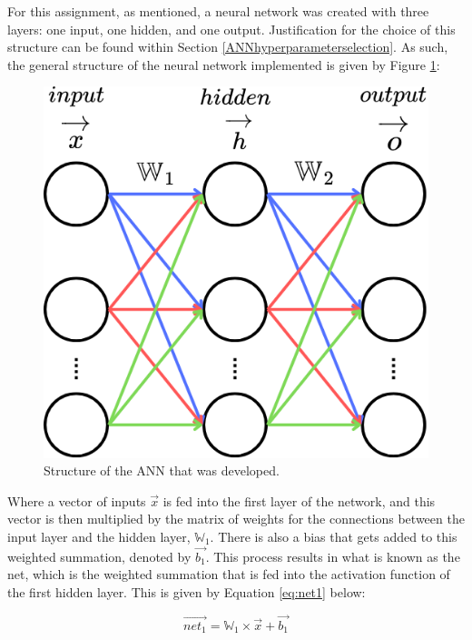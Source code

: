 \documentclass[a4paper]{article}
\begin{document}
For this assignment, as mentioned, a neural network was created with three layers: one input, one hidden, and one output. Justification for the choice of this structure can be found within Section \ref{ANNhyperparameterselection}. As such, the general structure of the neural network implemented is given by Figure \ref{fig:annstructure}:

\begin{figure}[h]
    \centering
    \includegraphics[scale = 0.5]{images/annstructure.png}
    \caption{Structure of the ANN that was developed.}
    \label{fig:annstructure}
\end{figure}

Where a vector of inputs $\overrightarrow{x}$ is fed into the first layer of the network, and this vector is then multiplied by the matrix of weights for the connections between the input layer and the hidden layer, $\mathbb W_1$. There is also a bias that gets added to this weighted summation, denoted by $\overrightarrow{b_1}$. This process results in what is known as the net, which is the weighted summation that is fed into the activation function of the first hidden layer. This is given by Equation \ref{eq:net1} below:

\begin{equation}
    \label{eq:net1}
    \overrightarrow{net_{1}} = \mathbb W_{1} \times \overrightarrow{x} + \overrightarrow{b_1}
\end{equation}
\end{document}
